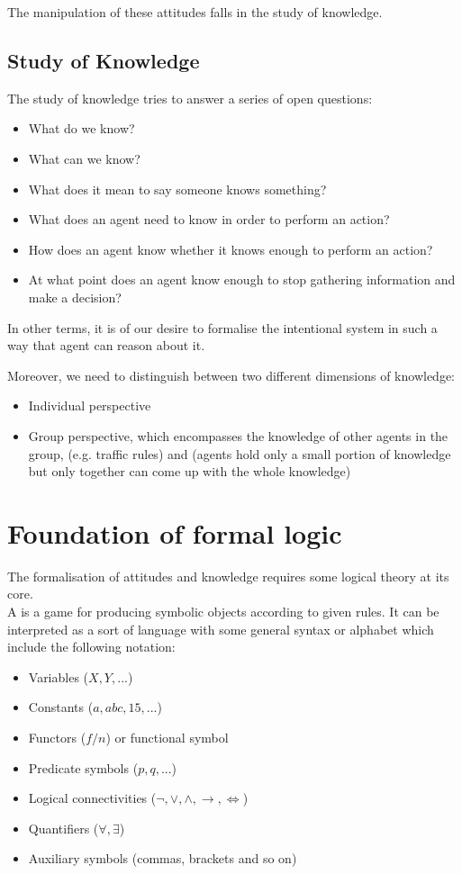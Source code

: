 The manipulation of these attitudes falls in the study of knowledge.
\subsection{Study of Knowledge}
The study of knowledge tries to answer a series of open questions:
\begin{itemize}
\item What do we know?
\item What can we know?
\item What does it mean to say someone knows something?
\item What does an agent need to know in order to perform an action?
\item How does an agent know whether it knows enough to perform an action?
\item At what point does an agent know enough to stop gathering information and make a decision?
\end{itemize}
In other terms, it is of our desire to formalise the intentional system in such a way that agent can reason about it.

Moreover, we need to distinguish between two different dimensions of knowledge:
\begin{itemize}
\item Individual perspective
\item Group perspective, which encompasses the knowledge of other agents in the group,  (e.g. traffic rules) and  (agents hold only a small portion of knowledge but only together can come up with the whole knowledge)
\end{itemize}


\section{Foundation of formal logic}

The formalisation of attitudes and knowledge requires some logical theory at its core.\\
A  is a game for producing symbolic objects according to given rules. It can be interpreted as a sort of language with some general syntax or alphabet which include the following notation:
\begin{itemize}
\item Variables ($X,Y, ...$)
\item Constants ($a, abc, 15, ...$)
\item Functors ($f/n$) or functional symbol
\item Predicate symbols ($p,q,...$)
\item Logical connectivities ($\neg, \lor, \land, \rightarrow, \iff$)
\item Quantifiers ($\forall, \exists$)
\item Auxiliary symbols (commas, brackets and so on)
\end{itemize}

